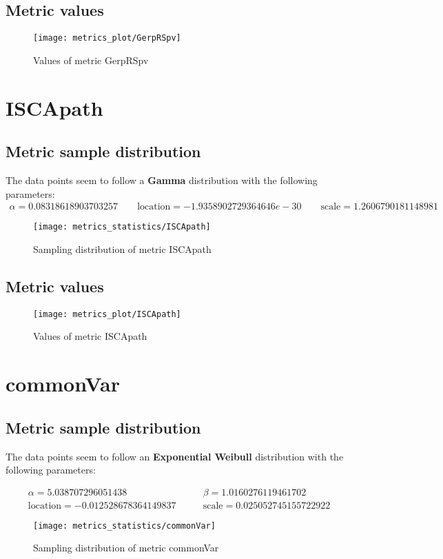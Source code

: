 \documentclass[\main/main.tex]{subfiles}
\begin{document}
\subsection{Metric values}
\begin{figure}
  \texttt{[image: metrics\_plot/GerpRSpv]}
  \caption{Values of metric GerpRSpv}
\end{figure}

\clearpage
\section{ISCApath}
\subsection{Metric sample distribution}
The data points seem to follow a \textbf{Gamma} distribution with the following parameters:
\begin{align*}
  \alpha   = 0.08318618903703257    \qquad  \text{location} = -1.9358902729364646e-30 \qquad \text{scale} = 1.2606790181148981
\end{align*}
\begin{figure}
  \texttt{[image: metrics\_statistics/ISCApath]}
  \caption{Sampling distribution of metric ISCApath}
\end{figure}
\subsection{Metric values}
\begin{figure}
  \texttt{[image: metrics\_plot/ISCApath]}
  \caption{Values of metric ISCApath}
\end{figure}

\clearpage
\section{commonVar}
\subsection{Metric sample distribution}
The data points seem to follow an \textbf{Exponential Weibull} distribution with the following parameters:

\begin{align*}
  \alpha   = 5.038707296051438            & \qquad  \beta = 1.0160276119461702         \\
  \text{location} = -0.012528678364149837 & \qquad \text{scale} = 0.025052745155722922
\end{align*}
\begin{figure}
  \texttt{[image: metrics\_statistics/commonVar]}
  \caption{Sampling distribution of metric commonVar}
\end{figure}
\end{document}
